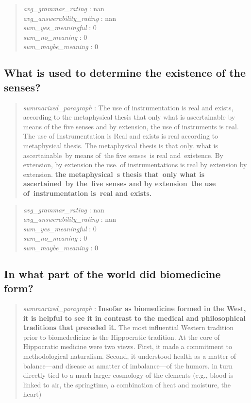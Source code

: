 \begin{quote}
\emph{avg\_grammar\_rating} : nan\\
\emph{avg\_answerability\_rating} : nan\\
\emph{sum\_yes\_meaningful} : 0\\
\emph{sum\_no\_meaning} : 0\\
\emph{sum\_maybe\_meaning} : 0
\end{quote}

\hypertarget{what-is-used-to-determine-the-existence-of-the-senses}{%
\subsection{What is used to determine the existence of the
senses?}\label{what-is-used-to-determine-the-existence-of-the-senses}}

\begin{quote}
\emph{summarized\_paragraph} : The use of instrumentation is real and
exists, according to the metaphysical thesis that only what is
ascertainable by means of the five senses and by extension, the use of
instruments is real. The use of Instrumentation is Real and exists is
real according to metaphysical thesis. The metaphysical thesis is that
only. what is~ ascertainable~by means of~the five senses~is real
and~existence. By extension, by extension the use. of instrumentations
is real by extension by extension. \textbf{the metaphysical~s thesis
that~only what is ascertained~by the~five senses and by extension~the
use of~instrumentation is~real and exists.}
\end{quote}

\begin{quote}
\emph{avg\_grammar\_rating} : nan\\
\emph{avg\_answerability\_rating} : nan\\
\emph{sum\_yes\_meaningful} : 0\\
\emph{sum\_no\_meaning} : 0\\
\emph{sum\_maybe\_meaning} : 0
\end{quote}

\hypertarget{in-what-part-of-the-world-did-biomedicine-form}{%
\subsection{In what part of the world did biomedicine
form?}\label{in-what-part-of-the-world-did-biomedicine-form}}

\begin{quote}
\emph{summarized\_paragraph} : \textbf{Insofar as biomedicine formed in
the West, it is helpful to see it in contrast to the medical and
philosophical traditions that preceded it.} The most influential Western
tradition prior to biomededicine is the Hippocratic tradition. At the
core of Hippocratic medicine were two views. First, it made a commitment
to methodological naturalism. Second, it understood health as a matter
of balance---and disease as amatter of imbalance---of the humors. in
turn directly tied to a much larger cosmology of the elements (e.g.,
blood is linked to air, the springtime, a combination of heat and
moisture, the heart)
\end{quote}

